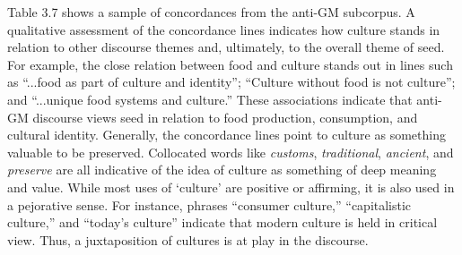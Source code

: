 Table 3.7 shows a sample of concordances from the anti-GM subcorpus. A qualitative assessment of the concordance lines indicates how culture stands in relation to other discourse themes and, ultimately, to the overall theme of seed. For example, the close relation between food and culture stands out in lines such as ``...food as part of culture and identity''; ``Culture without food is not culture''; and ``...unique food systems and culture.'' These associations indicate that anti-GM discourse views seed in relation to food production, consumption, and cultural identity. Generally, the concordance lines point to culture as something valuable to be preserved. Collocated words like \textit{customs}, \textit{traditional}, \textit{ancient}, and \textit{preserve} are all indicative of the idea of culture as something of deep meaning and value. While most uses of `culture' are positive or affirming, it is also used in a pejorative sense. For instance, phrases ``consumer culture,'' ``capitalistic culture,'' and ``today's culture'' indicate that modern culture is held in critical view. Thus, a juxtaposition of cultures is at play in the discourse.

